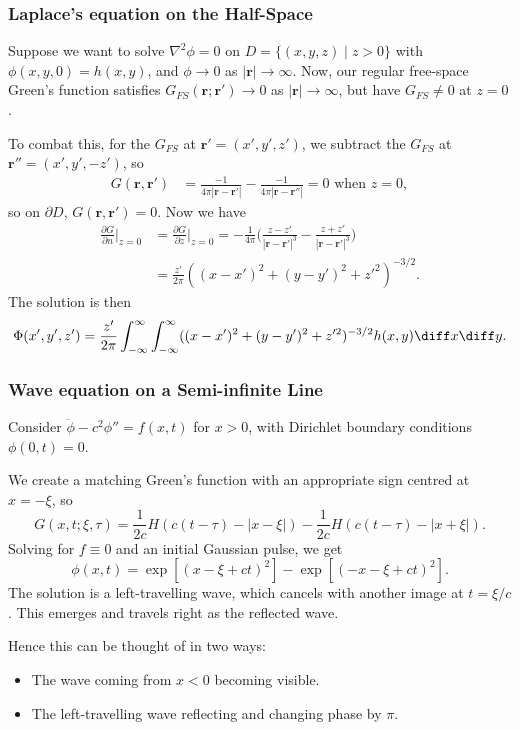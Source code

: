 \documentclass[12pt]{article}
\begin{document}
\subsubsection{Laplace's equation on the Half-Space}%
\label{subsub:laplace_s_equation_on_the_half_space}

Suppose we want to solve $\nabla^2 \phi = 0$ on $D = \{(x, y, z) \mid z > 0\}$ with $\phi(x, y, 0) = h(x, y)$, and $\phi \to 0$ as $|\mathbf{r}| \to \infty$. Now, our regular free-space Green's function satisfies $G_{FS}(\mathbf{r}; \mathbf{r}') \to 0$ as $|\mathbf{r}| \to \infty$, but have $G_{FS} \neq 0$ at $z = 0$.

To combat this, for the $G_{FS}$ at $\mathbf{r}' = (x', y', z')$, we subtract the $G_{FS}$ at $\mathbf{r}'' = (x', y', -z')$, so
\begin{align*}
	G(\mathbf{r}, \mathbf{r}') &= \frac{-1}{4 \pi|\mathbf{r} - \mathbf{r}'|} - \frac{-1}{4 \pi |\mathbf{r}- \mathbf{r}''|} = 0 \text{ when } z = 0,
\end{align*}
so on $\partial D$, $G(\mathbf{r}, \mathbf{r}') = 0$. Now we have
\begin{align*}
	\frac{\partial G}{\partial n} \biggr|_{z = 0} &= \frac{\partial G}{\partial z} \biggr|_{z = 0} = -\frac{1}{4\pi} \biggl( \frac{z - z'}{|\mathbf{r}-\mathbf{r}'|^3} - \frac{z + z'}{|\mathbf{r} - \mathbf{r}'|^3} \biggr) \\
						      &= \frac{z'}{2\pi}((x - x')^2 + (y-y')^2 + z'^2)^{-3/2}.
\end{align*}
The solution is then
\[
	\Phi(x',y',z') = \frac{z'}{2\pi} \int_{-\infty}^{\infty}\int_{-\infty}^{\infty} ((x-x')^2 + (y-y')^2 + z'^2)^{-3/2} h(x, y) \diff x \diff y
.\]

\subsubsection{Wave equation on a Semi-infinite Line}%
\label{subsub:wave_equation_on_a_semi_infinite_line}

Consider $\ddot \phi - c^2 \phi'' = f(x, t)$ for $x > 0$, with Dirichlet boundary conditions $\phi(0, t) = 0$.

We create a matching Green's function with an appropriate sign centred at $x = - \xi$, so
\[
	G(x, t; \xi, \tau) = \frac{1}{2c}H(c(t - \tau) - |x - \xi|) - \frac{1}{2c}H(c(t - \tau) - |x + \xi|)
.\]
Solving for $f \equiv 0$ and an initial Gaussian pulse, we get
\[
	\phi(x, t) = \exp [(x - \xi + ct)^2] - \exp[(-x-\xi+ct)^2]
.\]
The solution is a left-travelling wave, which cancels with another image at $t = \xi/c$. This emerges and travels right as the reflected wave.

Hence this can be thought of in two ways:
\begin{itemize}
	\item The wave coming from $x < 0$ becoming visible.
	\item The left-travelling wave reflecting and changing phase by $\pi$.
\end{itemize}


\newpage

\printindex
\end{document}
